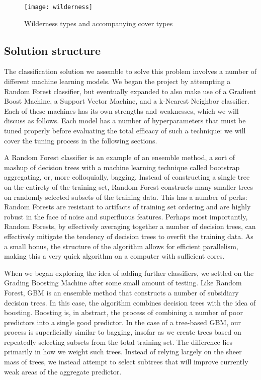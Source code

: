 \begin{figure*}
\centering
\texttt{[image: wilderness]}
 \caption{Wilderness types and accompanying cover types}
 \label{fig:wilderness}
\end{figure*}

\subsection{Solution structure}
The classification solution we assemble to solve this problem involves 
a number of different machine learning models.  We began the project by 
attempting a Random Forest classifier, but eventually expanded to also 
make use of a Gradient Boost Machine, a Support Vector Machine, and a 
k-Nearest Neighbor classifier.  Each of these machines has its own 
strengths and weaknesses, which we will discuss as follows.  Each model 
has a number of hyperparameters that must be tuned properly before 
evaluating the total efficacy of such a technique: we will cover the 
tuning process in the following sections.

A Random Forest classifier\cite{breiman2001random} is an example of an 
ensemble method, a sort of mashup of decision trees with a machine 
learning technique called bootstrap aggregating, or, more colloquially, 
bagging\cite{bagging}.  Instead of constructing a single tree on the 
entirety of the training set, Random Forest constructs many smaller 
trees on randomly selected subsets of the training data.  This has a 
number of perks: Random Forests are resistant to artifacts of training 
set ordering and are highly robust in the face of noise and superfluous 
features.  Perhaps most importantly, Random Forests, by effectively 
averaging together a number of decision trees, can effectively mitigate 
the tendency of decision trees to overfit the training data.  As a 
small bonus, the structure of the algorithm allows for efficient 
parallelism, making this a very quick algorithm on a computer with 
sufficient cores.

When we began exploring the idea of adding further classifiers, we 
settled on the Grading Boosting Machine\cite{gbm} after some small 
amount of testing.  Like Random Forest, GBM is an ensemble method that 
constructs a number of subsidiary decision trees.  In this case, the 
algorithm combines decision trees with the idea of 
boosting\cite{boosting}.  Boosting is, in abstract, the process of 
combining a number of poor predictors into a single good predictor.  
In the case of a tree-based GBM, our process is superficially similar 
to bagging, insofar as we create trees based on repeatedly selecting 
subsets from the total training set.  The difference lies primarily in 
how we weight such trees.  Instead of relying largely on the sheer mass 
of trees, we instead attempt to select subtrees that will improve 
currently weak areas of the aggregate predictor.

